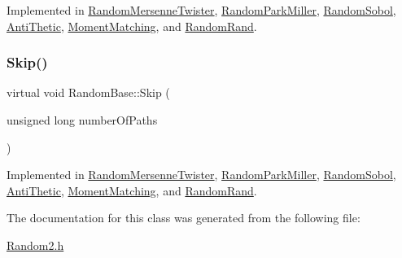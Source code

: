 Implemented in \hyperlink{classRandomMersenneTwister_ac03508508fce508b21a53ce0739b061b}{Random\+Mersenne\+Twister}, \hyperlink{classRandomParkMiller_aff4bf7d5efe1b695c88372ff9f9fa46e}{Random\+Park\+Miller}, \hyperlink{classRandomSobol_a6ede3a4386bf79e05dd0c1985cc4b3ca}{Random\+Sobol}, \hyperlink{classAntiThetic_a0561b133af3db59319d7ede6a52fb1d4}{Anti\+Thetic}, \hyperlink{classMomentMatching_a3700491fdae597126aab18fb5f42de04}{Moment\+Matching}, and \hyperlink{classRandomRand_abccae7b9cb11121a461e15959536843c}{Random\+Rand}.

\hypertarget{classRandomBase_a0531f44e3e2a71d14ef1490aa5d90b77}{}\label{classRandomBase_a0531f44e3e2a71d14ef1490aa5d90b77} 
\subsubsection{\texorpdfstring{Skip()}{Skip()}}
{\footnotesize\ttfamily virtual void Random\+Base\+::\+Skip (\begin{DoxyParamCaption}\item[{unsigned long}]{number\+Of\+Paths }\end{DoxyParamCaption})\hspace{0.3cm}{\ttfamily [pure virtual]}}



Implemented in \hyperlink{classRandomMersenneTwister_a624044e5b2516f7947382ab38911b4a5}{Random\+Mersenne\+Twister}, \hyperlink{classRandomParkMiller_a5a72cd434c23c8f79898b5fb5c455208}{Random\+Park\+Miller}, \hyperlink{classRandomSobol_a1bd5c22ad3a808a4ff9ca8706fdb0b58}{Random\+Sobol}, \hyperlink{classAntiThetic_ab401f6a7ce58643b3f147886d837e097}{Anti\+Thetic}, \hyperlink{classMomentMatching_a14d56de714eb1a9025f0ff1ea8956931}{Moment\+Matching}, and \hyperlink{classRandomRand_ab9e2f1049a7421aef97144a7aedd8d4b}{Random\+Rand}.



The documentation for this class was generated from the following file\+:\begin{DoxyCompactItemize}
\item 
\hyperlink{Random2_8h}{Random2.\+h}\end{DoxyCompactItemize}
